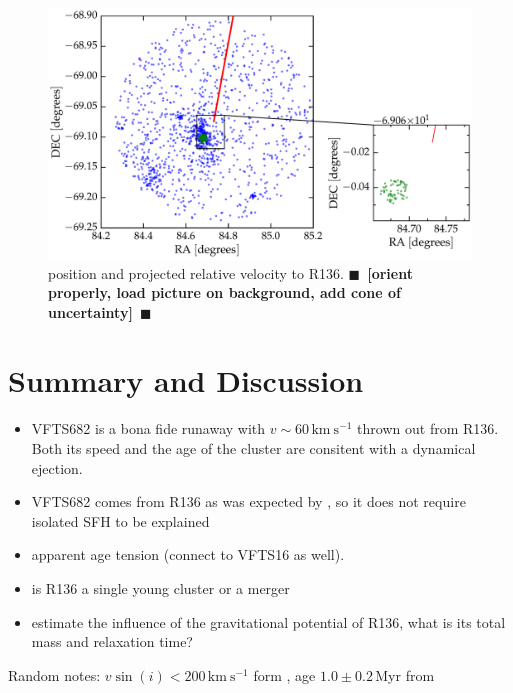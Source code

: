 \documentclass{aa}
\newcommand{\todo}[1]{{\large $\blacksquare$~\textbf{\color{red}[#1]}}~$\blacksquare$}
\begin{document}
\begin{figure}[htbp]
  \centering
  \includegraphics[width=\textwidth]{./figures/main_plot}  
  \caption{position and projected relative velocity to
    R136. \todo{orient properly, load  picture on background, add cone of uncertainty}}
  \label{fig:main}
\end{figure}

\section{Summary and Discussion}
\label{sec:discussion}

\begin{itemize}
\item VFTS682 is a bona fide runaway with $v\sim60\,\mathrm{km\
    s^{-1}}$ thrown out from R136. Both its speed and the age of the
  cluster are consitent with a dynamical ejection.
  \item VFTS682 comes from R136 as was expected by
  \cite{bestenlehner:11, fujii:11, banerjee:12}, so it does not
  require isolated SFH to be explained
\item apparent age tension (connect to VFTS16 as well).
\item is R136 a single young cluster or a merger
\item estimate the influence of the gravitational potential of R136,
  what is its total mass and relaxation time?
\end{itemize}

Random notes: $v\sin(i)<200\,\mathrm{km\ s^{-1}}$ form \cite{schneider:18}, age $1.0\pm 0.2$\,Myr
from \cite{schneider:18}




\end{document}
